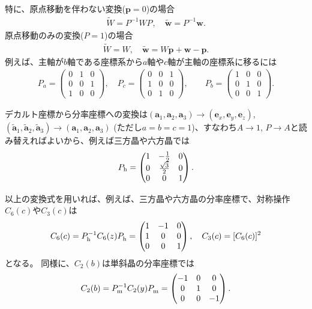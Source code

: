 \documentclass[11pt]{easymemo}
\begin{document}
特に、原点移動を伴わない変換($\bm{p}=0$)の場合
\begin{align}
  \widetilde{W}=P^{-1}WP^{},
  \quad
  \widetilde{\bm{w}}=P^{-1}\bm{w}.
\end{align}
原点移動のみの変換($P=1$)の場合
\begin{align}
  \widetilde{W}=W,
  \quad
  \widetilde{\bm{w}}=W\bm{p}+\bm{w}-\bm{p}.
\end{align}
例えば、主軸が$b$軸である座標系から$a$軸や$c$軸が主軸の座標系に移るには
\begin{align}
  P_{a}=\begin{pmatrix} 0 & 1 & 0 \\ 0 & 0 & 1 \\ 1 & 0 & 0 \end{pmatrix},
  \quad
  P_{c}=\begin{pmatrix} 0 & 0 & 1 \\ 1 & 0 & 0 \\ 0 & 1 & 0 \end{pmatrix},
  \quad\quad
  P_{b}=\begin{pmatrix} 1 & 0 & 0 \\ 0 & 1 & 0 \\ 0 & 0 & 1 \end{pmatrix}.
\end{align}

デカルト座標から分率座標への変換は$(\bm{a}_{1},\bm{a}_{2},\bm{a}_{3})\to(\bm{e}_{x},\bm{e}_{y},\bm{e}_{z})$, $(\widetilde{\bm{a}}_{1},\widetilde{\bm{a}}_{2},\widetilde{\bm{a}}_{3})\to(\bm{a}_{1},\bm{a}_{2},\bm{a}_{3})$ (ただし$a=b=c=1$)、すなわち$A\to1$, $P\to A$と読み替えればよいから、例えば三方晶や六方晶では
\begin{align}
P_{\rm h}=
\begin{pmatrix}
1 & -\frac{1}{2} & 0 \\
0 & \frac{\sqrt{3}}{2} & 0 \\
0 & 0 & 1
\end{pmatrix}.
\end{align}

以上の変換式を用いれば、例えば、三方晶や六方晶の分率座標で、対称操作$C_{6}(c)$や$C_{3}(c)$は
\begin{align}
  C_6(c)=P_{\rm h}^{-1}C_{6}(z)P_{\rm h}^{}=\begin{pmatrix}
    1 & -1 & 0 \\
    1 & 0  & 0 \\
    0 & 0  & 1
  \end{pmatrix},
  \quad
  C_3(c)=[C_{6}(c)]^{2}
\end{align}
となる。
同様に、$C_{2}(b)$は単斜晶の分率座標では
\begin{align}
  C_2(b)=P_{\rm m}^{-1}C_{2}(y)P_{\rm m}^{}=\begin{pmatrix}
    -1 & 0 & 0  \\
    0  & 1 & 0  \\
    0  & 0 & -1
  \end{pmatrix}.
\end{align}
\end{document}
